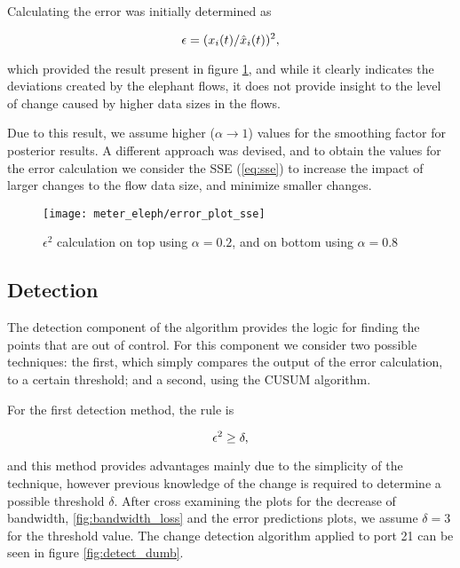 \par Calculating the error was initially determined as

\begin{equation}
    \centering
    \label{eq:division}
    \epsilon = (x_i(t)/\hat{x}_i(t))^2,
\end{equation}

\par which provided the result present in figure \ref{fig:error_plot_division_sse}, and while it clearly indicates the deviations created by the elephant flows, it 
does not provide insight to the level of change caused by higher data sizes in the flows.

Due to this result, we assume higher ($\alpha \rightarrow 1$) values for the smoothing factor for posterior results. A different approach was devised,
and to obtain the values for the error calculation we consider the SSE (\ref{eq:sse}) to increase the impact of larger changes to the flow data size,
and minimize smaller changes.

\begin{figure} [H]
    \texttt{[image: meter\_eleph/error\_plot\_sse]}
    \caption{$\epsilon^2$ calculation on top using $\alpha = 0.2$, and on bottom using $\alpha = 0.8$}
    \label{fig:error_plot_division_sse}
\end{figure}

\subsection{Detection}

The detection component of the algorithm provides the logic for finding the points that are out of control. For this component we consider two possible techniques:
the first, which simply compares the output of the error calculation, to a certain threshold; and a second, using the CUSUM algorithm. 

\par For the first detection method, the rule is 

\begin{equation*}
    \centering
    \label{eq:division}
    \epsilon^2 \geq \delta,
\end{equation*}

\par and this method provides advantages mainly due to the simplicity of the technique, however previous knowledge of the change is required to determine a possible
threshold $\delta$. After cross examining the plots for the decrease of bandwidth, \ref{fig:bandwidth_loss} and the error predictions plots, we assume $\delta = 3$
for the threshold value. The change detection algorithm applied to port 21 can be seen in figure \ref{fig:detect_dumb}.

